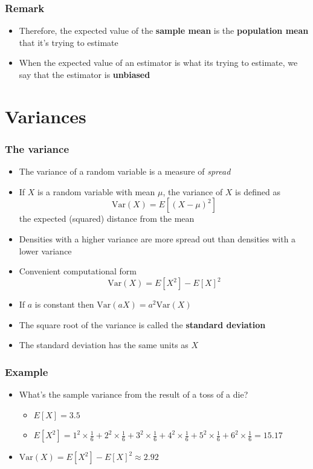 \documentclass[aspectratio=169]{beamer}
\newcommand{\Var}{\mathrm{Var}}
\begin{document}
\begin{frame}
  \frametitle{Remark}
  \begin{itemize}
  \item Therefore, the expected value of the {\bf sample mean} is the {\bf
      population mean} that it's trying to estimate
  \item When the expected value of an estimator is what its trying to estimate,
    we say that the estimator is {\bf unbiased}
  \end{itemize}
\end{frame}


\section{Variances}
\begin{frame}\frametitle{The variance}
  \begin{itemize}
  \item The variance of a random variable is a measure of {\em spread}
  \item If $X$ is a random variable with mean $\mu$, the variance of 
    $X$ is defined as
    $$
    \Var(X) = E[(X - \mu)^2]
    $$
    the expected (squared) distance from the mean
  \item Densities with a higher variance are more spread out than
    densities with a lower variance
  \end{itemize}
\end{frame}

\begin{frame}
  \begin{itemize}
  \item Convenient computational form
    $$
    \Var(X) = E[X^2] - E[X]^2
    $$
  \item If $a$ is constant then $\Var(aX) = a^2 \Var(X)$
  \item The square root of the variance is called the {\bf standard deviation}
  \item The standard deviation has the same units as $X$
  \end{itemize}
\end{frame}


\begin{frame}\frametitle{Example}
  \begin{itemize}
  \item   What's the sample variance from the result of a toss of a die? 
    \begin{itemize}
    \item $E[X] = 3.5$ 
    \item $E[X^2] = 1 ^ 2 \times \frac{1}{6} + 2 ^ 2 \times \frac{1}{6} +
  3 ^ 2 \times \frac{1}{6} + 4 ^ 2 \times \frac{1}{6} +
  5 ^ 2 \times \frac{1}{6} + 6 ^ 2 \times \frac{1}{6} = 15.17$ 
    \end{itemize}
  \item $\Var(X) = E[X^2] - E[X]^2 \approx 2.92$
 \end{itemize}
\end{frame}
\end{document}
